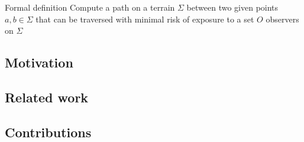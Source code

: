 \begin{frame}{Formal definition}
	\centering
	\Large
	Compute a path on a terrain $\Sigma$ between two given points $a, b \in \Sigma$ that can be traversed with minimal risk of exposure to a set $O$ observers on $\Sigma$
\end{frame}

\subsection{Motivation}


\subsection{Related work}


\subsection{Contributions}

